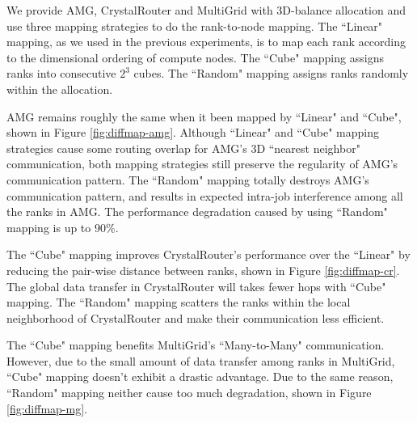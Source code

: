 \documentclass[conference]{IEEEtran}
\begin{document}
We provide AMG, CrystalRouter and MultiGrid with 3D-balance allocation and use three mapping strategies to do the rank-to-node mapping. The ``Linear" mapping, as we used in the previous experiments, is to map each rank according to the dimensional ordering of compute nodes. The ``Cube" mapping assigns ranks into consecutive $2^{3}$ cubes. The ``Random" mapping assigns ranks randomly within the allocation. 

AMG remains roughly the same when it been mapped by ``Linear" and ``Cube", shown in Figure \ref{fig:diffmap-amg}. Although ``Linear" and ``Cube" mapping strategies cause some routing overlap for AMG's 3D ``nearest neighbor" communication, both mapping strategies still preserve the regularity of AMG's communication pattern. The ``Random" mapping totally destroys AMG's communication pattern, and results in expected intra-job interference among all the ranks in AMG. The performance degradation caused by using ``Random" mapping is up to 90\%.

The ``Cube" mapping improves CrystalRouter's performance over the ``Linear" by reducing the pair-wise distance between ranks, shown in Figure \ref{fig:diffmap-cr}. The global data transfer in CrystalRouter will takes fewer hops with ``Cube" mapping. The ``Random" mapping scatters the ranks within the local neighborhood of CrystalRouter and make their communication less efficient. 


The ``Cube" mapping benefits MultiGrid's ``Many-to-Many" communication. However, due to the small amount of data transfer among ranks in MultiGrid, ``Cube" mapping doesn't exhibit a drastic advantage. Due to the same reason, ``Random" mapping neither cause too much degradation, shown in Figure \ref{fig:diffmap-mg}.
\end{document}
